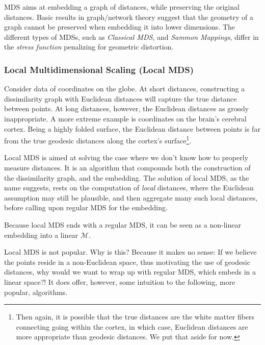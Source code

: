 \documentclass[]{book}
\theoremstyle{definition}
\theoremstyle{definition}
\theoremstyle{definition}
\theoremstyle{remark}
\let\BeginKnitrBlock\begin \let\EndKnitrBlock\end
\begin{document}
MDS aims at embedding a graph of distances, while preserving the
original distances. Basic results in graph/network theory
\citep{graham1988isometric} suggest that the geometry of a graph cannot
be preserved when embedding it into lower dimensions. The different
types of MDSs, such as \emph{Classical MDS}, and \emph{Sammon Mappings},
differ in the \emph{stress function} penalizing for geometric
distortion.

\subsubsection{Local Multidimensional Scaling (Local
MDS)}\label{local-multidimensional-scaling-local-mds}

\BeginKnitrBlock{example}
\protect\hypertarget{exm:non-euclidean}{}{\label{exm:non-euclidean}
}Consider data of coordinates on the globe. At short distances,
constructing a dissimilarity graph with Euclidean distances will capture
the true distance between points. At long distances, however, the
Euclidean distances as grossly inappropriate. A more extreme example is
coordinates on the brain's cerebral cortex. Being a highly folded
surface, the Euclidean distance between points is far from the true
geodesic distances along the cortex's surface\footnote{Then again, it is
  possible that the true distances are the white matter fibers
  connecting going within the cortex, in which case, Euclidean distances
  are more appropriate than geodesic distances. We put that aside for
  now.}.
\EndKnitrBlock{example}

Local MDS is aimed at solving the case where we don't know how to
properly measure distances. It is an algorithm that compounds both the
construction of the dissimilarity graph, and the embedding. The solution
of local MDS, as the name suggests, rests on the computation of
\emph{local} distances, where the Euclidean assumption may still be
plausible, and then aggregate many such local distances, before calling
upon regular MDS for the embedding.

Because local MDS ends with a regular MDS, it can be seen as a
non-linear embedding into a linear \(\mathcal{M}\).

Local MDS is not popular. Why is this? Because it makes no sense: If we
believe the points reside in a non-Euclidean space, thus motivating the
use of geodesic distances, why would we want to wrap up with regular
MDS, which embeds in a linear space?! It does offer, however, some
intuition to the following, more popular, algorithms.
\end{document}
